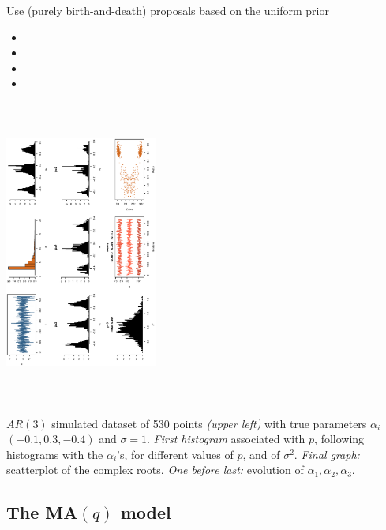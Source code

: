 \begin{slide}
\end{slide}\begin{slide}

Use (purely birth-and-death) proposals based on the uniform prior
\def\too{$\rightarrow$}
\begin{itemize}
\item {\Sepia{\sf k  \too\ k+1}}  {}
\item {\Sepia{\sf k  \too\ k+2}}  {}
\item {\Sepia{\sf k  \too\ k-1}}  {}
\item {\Sepia{\sf k  \too\ k-2}}  {}
\end{itemize}

\end{slide}\begin{slide}

\includegraphics[width=5cm,height=10cm,angle=270]{figures/plain.ps}

\footnotesize
$AR(3)$ simulated dataset of 530 points {\em (upper left)} 
with true parameters $\alpha_i$ $(-0.1,0.3,-0.4)$ and $\sigma=1$.
{\em First histogram} associated with $p$, following
histograms with the $\alpha_i$'s, for
different values of $p$, and of $\sigma^2$. {\em Final graph:} scatterplot
of the complex roots. {\em One before last:} evolution of $\alpha_1,\alpha_2,\alpha_3$.
\normalsize

\end{slide}\subsection{The MA$(q)$ model}\begin{slide}


\end{slide}
